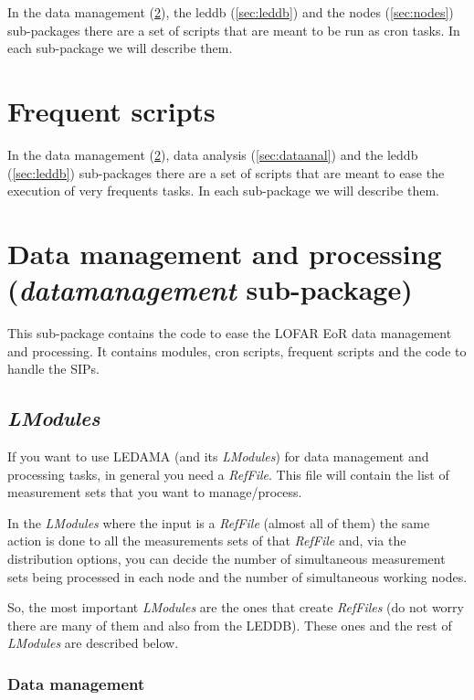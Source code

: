 \documentclass[a4paper,11pt]{article}
\begin{document}
In the data management (\ref{sec:datamp}), the leddb (\ref{sec:leddb}) and the nodes (\ref{sec:nodes}) sub-packages there are a set of scripts that are meant to be run as cron tasks. In each sub-package we will describe them.

\section{Frequent scripts}

In the data management (\ref{sec:datamp}), data analysis (\ref{sec:dataanal}) and the leddb (\ref{sec:leddb}) sub-packages there are a set of scripts that are meant to ease the execution of very frequents tasks. In each sub-package we will describe them.  

\section{Data management and processing (\textit{datamanagement} sub-package)}
\label{sec:datamp}

This sub-package contains the code to ease the LOFAR EoR data management and processing. It contains modules, cron scripts, frequent scripts and the code to handle the SIPs.

\subsection{\textit{LModules}}

If you want to use LEDAMA (and its \textit{LModules}) for data management and processing tasks, in general you need a \textit{RefFile}. This file will contain the list of measurement sets that you want to manage/process.

In the \textit{LModules} where the input is a \textit{RefFile} (almost all of them) the same action is done to all the measurements sets of that \textit{RefFile} and, via the distribution options, you can decide the number of simultaneous measurement sets being processed in each node and the number of simultaneous working nodes.

So, the most important \textit{LModules} are the ones that create \textit{RefFiles} (do not worry there are many of them and also from the LEDDB). These ones and the rest of \textit{LModules} are described below.

\subsubsection{Data management}
\end{document}
